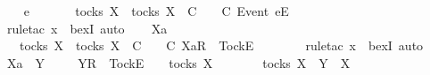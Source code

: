 \isanewline
\ \ \isamarkupfalse%
\ e\ {\isasymsigma}{\isacharprime}\isanewline
\ \ \isamarkupfalse%
\ {\isachardoublequoteopen}{\isacharbrackleft}{\isacharbrackright}\ {\isasymin}\ tocks\ X\ {\isasymLongrightarrow}\ {\isasymexists}{\isasymrho}{\isacharprime}{\isasymin}tocks\ X{\isachardot}\ {\isasymrho}{\isacharprime}\ {\isasymsubseteq}\isactrlsub C\ {\isacharbrackleft}{\isacharbrackright}\ {\isasymand}\ {\isasymrho}{\isacharprime}\ {\isasymle}\isactrlsub C\ {\isacharbrackleft}Event\ e{\isacharbrackright}\isactrlsub E\ {\isacharhash}\ {\isasymsigma}{\isacharprime}{\isachardoublequoteclose}\isanewline
\ \ \ \ \isamarkupfalse%
\ {\isacharparenleft}rule{\isacharunderscore}tac\ x{\isacharequal}{\isachardoublequoteopen}{\isacharbrackleft}{\isacharbrackright}{\isachardoublequoteclose}\ \ bexI{\isacharcomma}\ auto{\isacharparenright}\isanewline
{}\isamarkupfalse%
\isanewline
\ \ \isamarkupfalse%
\ Xa\ {\isasymsigma}{\isacharprime}\isanewline
\ \ \isamarkupfalse%
\ {\isachardoublequoteopen}{\isacharbrackleft}{\isacharbrackright}\ {\isasymin}\ tocks\ X\ {\isasymLongrightarrow}\ {\isasymexists}{\isasymrho}{\isacharprime}{\isasymin}tocks\ X{\isachardot}\ {\isasymrho}{\isacharprime}\ {\isasymsubseteq}\isactrlsub C\ {\isacharbrackleft}{\isacharbrackright}\ {\isasymand}\ {\isasymrho}{\isacharprime}\ {\isasymle}\isactrlsub C\ {\isacharbrackleft}Xa{\isacharbrackright}\isactrlsub R\ {\isacharhash}\ {\isacharbrackleft}Tock{\isacharbrackright}\isactrlsub E\ {\isacharhash}\ {\isasymsigma}{\isacharprime}{\isachardoublequoteclose}\isanewline
\ \ \ \ \isamarkupfalse%
\ {\isacharparenleft}rule{\isacharunderscore}tac\ x{\isacharequal}{\isachardoublequoteopen}{\isacharbrackleft}{\isacharbrackright}{\isachardoublequoteclose}\ \ bexI{\isacharcomma}\ auto{\isacharparenright}\isanewline
{}\isamarkupfalse%
\isanewline
\ \ \isamarkupfalse%
\ Xa\ {\isasymrho}\ Y\ {\isasymsigma}{\isacharprime}\isanewline
\ \ \isamarkupfalse%
\ {\isachardoublequoteopen}{\isacharbrackleft}Y{\isacharbrackright}\isactrlsub R\ {\isacharhash}\ {\isacharbrackleft}Tock{\isacharbrackright}\isactrlsub E\ {\isacharhash}\ {\isasymsigma}{\isacharprime}\ {\isasymin}\ tocks\ X{\isachardoublequoteclose}\isanewline
\ \ \isamarkupfalse%
\ \isamarkupfalse%
\ {\isachardoublequoteopen}{\isasymsigma}{\isacharprime}\ {\isasymin}\ tocks\ X\ {\isasymand}\ Y\ {\isasymsubseteq}\ X{\isachardoublequoteclose}\isanewline
